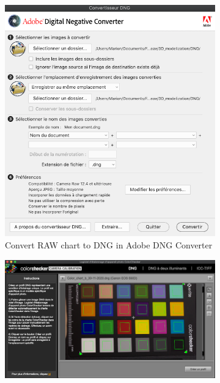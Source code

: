 \documentclass[10pt,letter,english]{article}
\begin{document}
\begin{figure}[H]
\centering
\begin{subfigure}[t]{.6\textwidth}
  \centering
  \includegraphics[width=1\textwidth]{Figures/AdobeDNGConverter.png}
  \caption{Convert RAW chart to DNG in Adobe DNG Converter}
  \label{adobe_dng}
\end{subfigure}
\vspace{10pt}
\begin{subfigure}[t]{.45\textwidth}
  \centering
  \includegraphics[width=1\textwidth]{Figures/ColorChecker camera cailbration.png}

\end{subfigure}
\end{figure}
\end{document}
